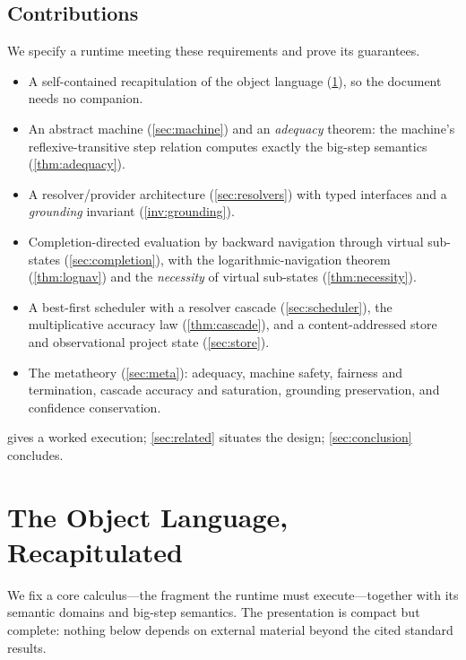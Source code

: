\documentclass[11pt,a4paper]{article}
\theoremstyle{plain}
\theoremstyle{definition}
\theoremstyle{remark}
\begin{document}
\subsection{Contributions}

We specify a runtime meeting these requirements and prove its guarantees.

\begin{itemize}[leftmargin=1.5em]
\item A self-contained recapitulation of the object language
(\cref{sec:language}), so the document needs no companion.
\item An abstract machine (\cref{sec:machine}) and an \emph{adequacy} theorem:
the machine's reflexive-transitive step relation computes exactly the big-step
semantics (\cref{thm:adequacy}).
\item A resolver/provider architecture (\cref{sec:resolvers}) with typed
interfaces and a \emph{grounding} invariant (\cref{inv:grounding}).
\item Completion-directed evaluation by backward navigation through virtual
sub-states (\cref{sec:completion}), with the logarithmic-navigation theorem
(\cref{thm:lognav}) and the \emph{necessity} of virtual sub-states
(\cref{thm:necessity}).
\item A best-first scheduler with a resolver cascade (\cref{sec:scheduler}),
the multiplicative accuracy law (\cref{thm:cascade}), and a content-addressed
store and observational project state (\cref{sec:store}).
\item The metatheory (\cref{sec:meta}): adequacy, machine safety, fairness and
termination, cascade accuracy and saturation, grounding preservation, and
confidence conservation.
\end{itemize}

 gives a worked execution; \cref{sec:related} situates the
design; \cref{sec:conclusion} concludes.

\section{The Object Language, Recapitulated}
\label{sec:language}

We fix a core calculus---the fragment the runtime must execute---together with
its semantic domains and big-step semantics. The presentation is compact but
complete: nothing below depends on external material beyond the cited standard
results.
\end{document}
